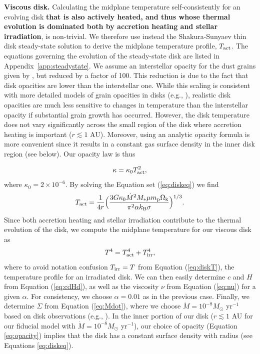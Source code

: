 \documentclass[apj]{emulateapj}
\newcommand{\App}[1]{Appendix~\ref{#1}}
\begin{document}
\textbf{Viscous disk.} %
Calculating the midplane temperature self-consistently for an evolving disk \textbf{that is also actively heated, and thus whose thermal evolution is dominated both by accretion heating and stellar irradiation}, is non-trivial. We therefore use instead the Shakura-Sunyaev thin disk steady-state solution to derive the midplane temperature profile, $T_{\rm act}$. The equations governing the evolution of the steady-state disk are listed in \App{app:steadystate}. We assume an interstellar opacity for the dust grains given by \citet{bell94}, but reduced by a factor of 100. This reduction is due to the fact that disk opacities are lower than the interstellar one. While this scaling is consistent with more detailed models of grain opacities in disks (e.g., \citealt{mordasini14}), realistic disk opacities are much less sensitive to changes in temperature than the interstellar opacity if substantial grain growth has occurred. However, the disk temperature does not vary significantly across the small region of the disk where accretion heating is important ($r \lesssim 1$ AU). Moreover, using an analytic opacity formula is more convenient since it results in a constant gas surface density in the inner disk region (see below). Our opacity law is thus

\begin{equation}
\label{eq:opacity}
\kappa=\kappa_0 T_{\rm act}^2,
\end{equation}
where $\kappa_0=2 \times 10^{-6}$. By solving the Equation set (\ref{eq:diskeq}) we find
\begin{equation}
\label{eq:Tdact}
T_{\rm act}=\frac{1}{4 r} \Big(\frac{3 G \kappa_0\dot{M}^2 M_* \mu m_{\rm p} \Omega_{\rm k}}{\pi^2 \alpha k_{\rm B} \sigma}\Big)^{1/3}.
\end{equation}
Since both accretion heating and stellar irradiation contribute to the thermal evolution of the disk, we compute the midplane temperature for our viscous disk as
\begin{equation}
\label{eq:activeT}
T^4 = T_{\rm act}^4 + T_{\rm irr}^4,
\end{equation}
where to avoid notation confusion $T_{\rm irr}=T$ from Equation (\ref{eq:diskT}), the temperature profile for an irradiated disk. We can then easily determine  $c$ and $H$ from Equation (\ref{eq:cdHd}), as well as the viscosity $\nu$ from Equation (\ref{eq:nu}) for a given $\alpha$. For consistency, we choose  $\alpha=0.01$ as in the previous case. Finally, we determine $\Sigma$ from Equation (\ref{eq:Mdot}), where we choose $\dot{M}=10^{-8} M_{\odot}$ yr$^{-1}$ based on disk observations (e.g., \citealt{andrews10}). In the inner portion of our disk ($r  \lesssim 1$ AU for our fiducial model with $\dot{M}=10^{-8} M_{\odot}$ yr$^{-1}$), our choice of opacity (Equation \ref{eq:opacity}) implies that the disk has a constant surface density with radius (see Equations \ref{eq:diskeq}).
\end{document}
